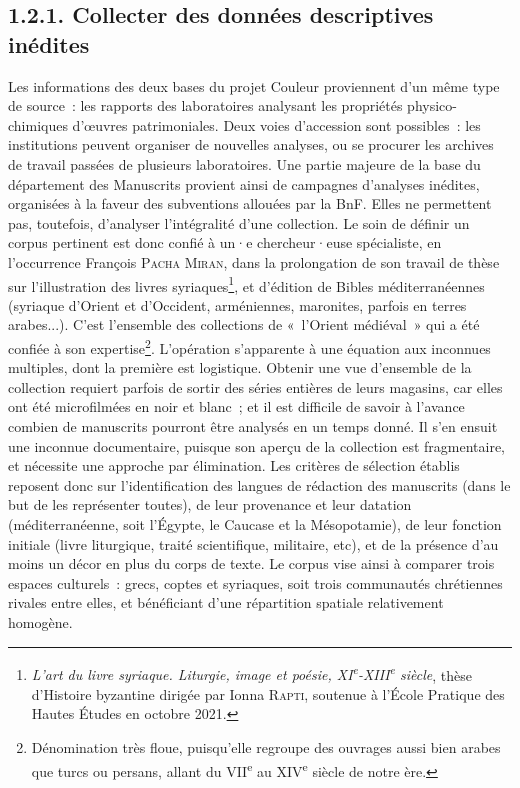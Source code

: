 \documentclass[a4paper,12pt, twoside]{book}
\begin{document}
\subsection*{1.2.1. Collecter des données descriptives inédites}

Les informations des deux bases du projet Couleur proviennent d’un même type de source~: les rapports des laboratoires analysant les propriétés physico-chimiques d’œuvres patrimoniales. Deux voies d’accession sont possibles~: les institutions peuvent organiser de nouvelles analyses, ou se procurer les archives de travail passées de plusieurs laboratoires. Une partie majeure de la base du département des Manuscrits provient ainsi de campagnes d’analyses inédites, organisées à la faveur des subventions allouées par la BnF. Elles ne permettent pas, toutefois, d’analyser l’intégralité d’une collection. Le soin de définir un corpus pertinent est donc confié à un·e chercheur·euse spécialiste, en l’occurrence François \textsc{Pacha Miran}, dans la prolongation de son travail de thèse sur l’illustration des livres syriaques\footnote{\textit{L'art du livre syriaque. Liturgie, image et poésie, XI\textsuperscript{e}-XIII\textsuperscript{e} siècle}, thèse d’Histoire byzantine dirigée par Ionna \textsc{Rapti}, soutenue à l’École Pratique des Hautes Études en octobre 2021.}, et d’édition de Bibles méditerranéennes (syriaque d’Orient et d’Occident, arméniennes, maronites, parfois en terres arabes...). C’est l’ensemble des collections de «~l’Orient médiéval~» qui a été confiée à son expertise\footnote{Dénomination très floue, puisqu’elle regroupe des ouvrages aussi bien arabes que turcs ou persans, allant du VII\textsuperscript{e} au XIV\textsuperscript{e} siècle de notre ère.}. L’opération s’apparente à une équation aux inconnues multiples, dont la première est logistique. Obtenir une vue d’ensemble de la collection requiert parfois de sortir des séries entières de leurs magasins, car elles ont été microfilmées en noir et blanc~; et il est difficile de savoir à l’avance combien de manuscrits pourront être analysés en un temps donné. Il s’en ensuit une inconnue documentaire, puisque son aperçu de la collection est fragmentaire, et nécessite une approche par élimination. Les critères de sélection établis reposent donc sur l’identification des langues de rédaction des manuscrits (dans le but de les représenter toutes), de leur provenance et leur datation (méditerranéenne, soit l’Égypte, le Caucase et la Mésopotamie), de leur fonction initiale (livre liturgique, traité scientifique, militaire, etc), et de la présence d’au moins un décor en plus du corps de texte. Le corpus vise ainsi à comparer trois espaces culturels~: grecs, coptes et syriaques, soit trois communautés chrétiennes rivales entre elles, et bénéficiant d’une répartition spatiale relativement homogène.
\end{document}
